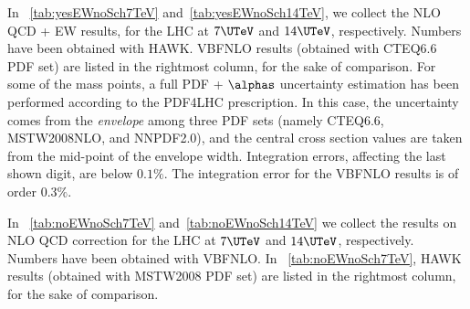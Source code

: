 
In \Tables~\ref{tab:yesEWnoSch7TeV} and~\ref{tab:yesEWnoSch14TeV}, we collect
the NLO QCD + EW results, for the LHC at $7\UTeV$ and $14\UTeV$, respectively.
Numbers have been obtained with {\sc HAWK}. {\sc VBFNLO} results (obtained
with CTEQ6.6 PDF set) are listed in the rightmost column, for the sake of
comparison. For some of the mass points, a full PDF + $\alphas$ uncertainty
estimation has been performed according to the PDF4LHC prescription. In this
case, the uncertainty comes from the {\em envelope} among three PDF sets
(namely CTEQ6.6, MSTW2008NLO, and NNPDF2.0), and the central cross section
values are taken from the mid-point of the envelope width.  Integration
errors, affecting the last shown digit, are below $0.1\%$.  The integration
error for the {\sc VBFNLO} results is of order $0.3\%$.

In \Tables~\ref{tab:noEWnoSch7TeV} and~\ref{tab:noEWnoSch14TeV} we collect the
results on NLO QCD correction for the LHC at $7\UTeV$ and $14\UTeV$, respectively.
Numbers have been obtained with {\sc VBFNLO}. In
\Table~\ref{tab:noEWnoSch7TeV}, {\sc HAWK} results (obtained with MSTW2008 PDF
set) are listed in the rightmost column, for the sake of comparison.


